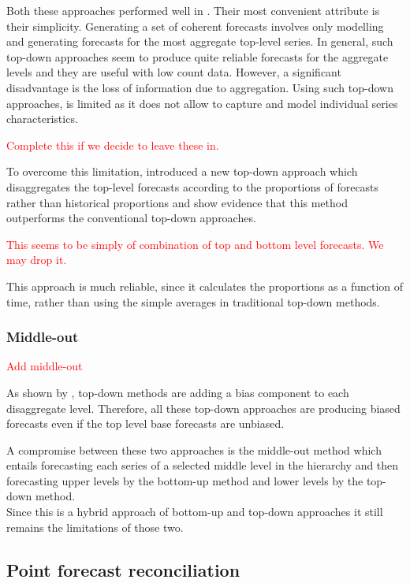 \documentclass[graybox]{svmult}
\begin{document}
Both these approaches performed well in \cite{gross1990}. Their most convenient attribute is their simplicity. Generating a set of coherent forecasts involves only modelling and generating forecasts for the most aggregate top-level series. In general, such top-down approaches seem to produce quite reliable forecasts for the aggregate levels and they are useful with low count data. However, a significant disadvantage is the loss of information due to aggregation. Using such top-down approaches, is limited as it does not allow to capture and model individual series characteristics.

\textcolor{red}{Complete this if we decide to leave these in.}

To overcome this limitation, \cite{AthEtAl2009} introduced a new top-down approach which disaggregates the top-level forecasts according to the proportions of forecasts rather than historical proportions and show evidence that this method outperforms the conventional top-down approaches.



\textcolor{red}{This seems to be simply of combination of top and bottom level forecasts. We may drop it. }


This approach is much reliable, since it calculates the proportions as a function of time, rather than using the simple averages in traditional top-down methods.

\subsubsection{Middle-out}
\textcolor{red}{Add middle-out}

As shown by \cite{HynEtAl2011}, top-down methods are adding a bias component to each disaggregate level. Therefore, all these top-down approaches are producing biased forecasts even if the top level base forecasts are unbiased.

A compromise between these two approaches is the middle-out method which entails forecasting each series of a selected middle level in the hierarchy and then forecasting upper levels by the bottom-up method and lower levels by the top-down method.\\
Since this is a hybrid approach of bottom-up and top-down approaches it still remains the limitations of those two.

\subsection{Point forecast reconciliation}\label{sec:reconciliation approaches}
\end{document}
